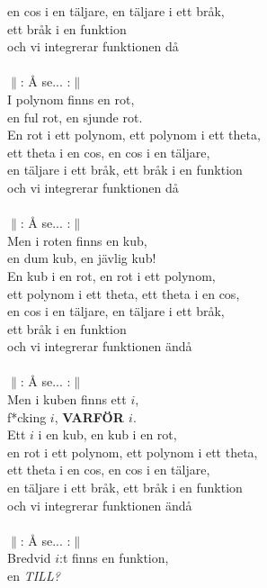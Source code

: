 \documentclass[a6paper, 10pt, twoside]{article}
\begin{document}
\begin{lyrics}
en cos i en täljare, en täljare i ett bråk, \\
ett bråk i en funktion \\
och vi integrerar funktionen då\\
\vspace{7pt}\\
$\|$: Å se... :$\|$ \\
I polynom finns en rot, \\
en ful rot, en sjunde rot. \\
En rot i ett polynom, ett polynom i ett theta, \\
ett theta i en cos, en cos i en täljare, \\
en täljare i ett bråk, ett bråk i en funktion \\
och vi integrerar funktionen då \\
\vspace{7pt}\\
$\|$: Å se... :$\|$ \\
Men i roten finns en kub, \\
en dum kub, en jävlig kub! \\
En kub i en rot, en rot i ett polynom, \\
ett polynom i ett theta, ett theta i en cos, \\
en cos i en täljare, en täljare i ett bråk, \\
ett bråk i en funktion \\
och vi integrerar funktionen ändå \\
\vspace{7pt}\\
$\|$: Å se... :$\|$ \\
Men i kuben finns ett $i$, \\
f*cking $i$, \textbf{VARFÖR $i$}. \\
Ett $i$ i en kub, en kub i en rot, \\
en rot i ett polynom, ett polynom i ett theta, \\
ett theta i en cos, en cos i en täljare, \\
en täljare i ett bråk, ett bråk i en funktion \\
och vi integrerar funktionen ändå \\
\vspace{7pt}\\
$\|$: Å se... :$\|$ \\
Bredvid $i$:t finns en funktion, \\
en \textit{TILL?} \\
\vspace{-2pt}\\

\end{lyrics}
\end{document}
